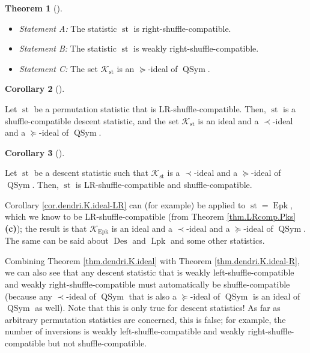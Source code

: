 \documentclass[numbers=enddot,12pt,final,onecolumn,notitlepage]{scrartcl}%
\theoremstyle{definition}
\newtheorem{theo}{Theorem}[section]
\newenvironment{theorem}[1][]
{\begin{theo}[#1]\begin{leftbar}}
{\end{leftbar}\end{theo}}
\newtheorem{coro}[theo]{Corollary}
\newenvironment{corollary}[1][]
{\begin{coro}[#1]\begin{leftbar}}
{\end{leftbar}\end{coro}}
\newenvironment{vershort}{}{}
\begin{document}
\begin{vershort}
\begin{theorem}
\begin{itemize}
\item \textit{Statement A:} The statistic $\operatorname*{st}$ is right-shuffle-compatible.

\item \textit{Statement B:} The statistic $\operatorname*{st}$ is weakly right-shuffle-compatible.

\item \textit{Statement C:} The set $\mathcal{K}_{\operatorname*{st}}$ is an
$\left.  \succeq\right.  $-ideal of $\operatorname*{QSym}$.
\end{itemize}
\end{theorem}

\begin{corollary}
\label{cor.dendri.K.ideal-LR}Let $\operatorname*{st}$ be a permutation
statistic that is LR-shuffle-compatible. Then, $\operatorname*{st}$ is a
shuffle-compatible descent statistic, and the set $\mathcal{K}%
_{\operatorname*{st}}$ is an ideal and a $\left.  \prec\right.  $-ideal and a
$\left.  \succeq\right.  $-ideal of $\operatorname*{QSym}$.
\end{corollary}

\begin{corollary}
\label{cor.dendri.K.ideal-LRi}Let $\operatorname*{st}$ be a descent statistic
such that $\mathcal{K}_{\operatorname*{st}}$ is a $\left.  \prec\right.
$-ideal and a $\left.  \succeq\right.  $-ideal of $\operatorname*{QSym}$.
Then, $\operatorname*{st}$ is LR-shuffle-compatible and shuffle-compatible.
\end{corollary}

Corollary \ref{cor.dendri.K.ideal-LR} can (for example) be applied to
$\operatorname*{st}=\operatorname*{Epk}$, which we know to be
LR-shuffle-compatible (from Theorem \ref{thm.LRcomp.Pks} \textbf{(c)}); the
result is that $\mathcal{K}_{\operatorname*{Epk}}$ is an ideal and a $\left.
\prec\right.  $-ideal and a $\left.  \succeq\right.  $-ideal of
$\operatorname*{QSym}$. The same can be said about $\operatorname*{Des}$ and
$\operatorname*{Lpk}$ and some other statistics.

Combining Theorem \ref{thm.dendri.K.ideal} with Theorem
\ref{thm.dendri.K.ideal-R}, we can also see that any descent statistic that is
weakly left-shuffle-compatible and weakly right-shuffle-compatible must
automatically be shuffle-compatible (because any $\left.  \prec\right.
$-ideal of $\operatorname*{QSym}$ that is also a $\left.  \succeq\right.
$-ideal of $\operatorname*{QSym}$ is an ideal of $\operatorname*{QSym}$ as
well). Note that this is only true for descent statistics! As far as arbitrary
permutation statistics are concerned, this is false; for example, the number
of inversions is weakly left-shuffle-compatible and weakly
right-shuffle-compatible but not shuffle-compatible.


\end{vershort}
\end{document}
